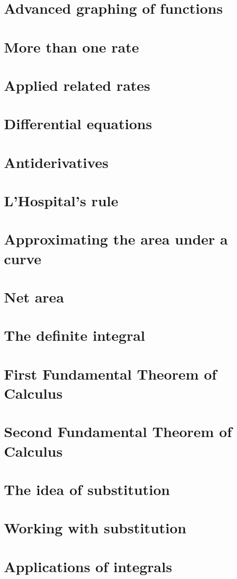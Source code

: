 \documentclass{ximera}
\begin{document}
\section{Advanced graphing of functions}
\section{More than one rate}
\section{Applied related rates}
\section{Differential equations}
\section{Antiderivatives}
\section{L'Hospital's rule}
\section{Approximating the area under a curve}
\section{Net area}
\section{The definite integral}
\section{First Fundamental Theorem of Calculus}
\section{Second Fundamental Theorem of Calculus}
\section{The idea of substitution}
\section{Working with substitution}
\section{Applications of integrals}
\end{document}
